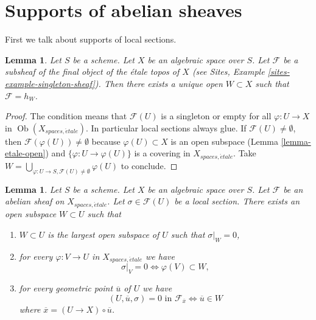 \documentclass{stacks-project}
\theoremstyle{plain}
\newtheorem{lemma}[subsection]{Lemma}
\theoremstyle{definition}
\theoremstyle{remark}
\numberwithin{equation}{subsection}
\def\Ob{\mathop{\mathrm{Ob}}\nolimits}
\def\etale{{\acute{e}tale}}
\begin{document}
\section{Supports of abelian sheaves}
\label{section-support}

\noindent
First we talk about supports of local sections.

\begin{lemma}
\label{lemma-support-subsheaf-final}
Let $S$ be a scheme. Let $X$ be an algebraic space over $S$.
Let $\mathcal{F}$ be a subsheaf of the final object of the \'etale
topos of $X$ (see
Sites, Example \ref{sites-example-singleton-sheaf}).
Then there exists a unique open
$W \subset X$ such that $\mathcal{F} = h_W$.
\end{lemma}

\begin{proof}
The condition means that $\mathcal{F}(U)$ is a singleton or
empty for all $\varphi : U \to X$ in $\Ob(X_{spaces, \etale})$.
In particular local sections always glue. If
$\mathcal{F}(U) \not = \emptyset$, then
$\mathcal{F}(\varphi(U)) \not = \emptyset$ because
$\varphi(U) \subset X$ is an open subspace
(Lemma \ref{lemma-etale-open})
and
$\{\varphi : U \to \varphi(U)\}$ is a covering in $X_{spaces, \etale}$.
Take
$W = \bigcup_{\varphi : U \to S, \mathcal{F}(U) \not = \emptyset} \varphi(U)$
to conclude.
\end{proof}

\begin{lemma}
\label{lemma-zero-over-image}
Let $S$ be a scheme.
Let $X$ be an algebraic space over $S$.
Let $\mathcal{F}$ be an abelian sheaf on $X_{spaces, \etale}$.
Let $\sigma \in \mathcal{F}(U)$ be a local section.
There exists an open subspace $W \subset U$ such that
\begin{enumerate}
\item $W \subset U$ is the largest open subspace of $U$ such
that $\sigma|_W = 0$,
\item for every $\varphi : V \to U$ in $X_{spaces, \etale}$ we have
$$
\sigma|_V = 0 \Leftrightarrow \varphi(V) \subset W,
$$
\item for every geometric point $\overline{u}$ of $U$ we have
$$
(U, \overline{u}, \sigma) = 0\text{ in }\mathcal{F}_{\overline{x}}
\Leftrightarrow
\overline{u} \in W
$$
where $\overline{x} = (U \to X) \circ \overline{u}$.
\end{enumerate}
\end{lemma}
\end{document}
